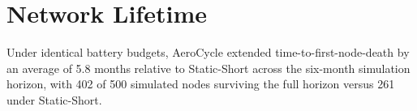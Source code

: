 \section{Network Lifetime}
Under identical battery budgets, AeroCycle extended time-to-first-node-death by an average of
5.8 months relative to Static-Short across the six-month simulation horizon, with 402 of 500
simulated nodes surviving the full horizon versus 261 under Static-Short.
